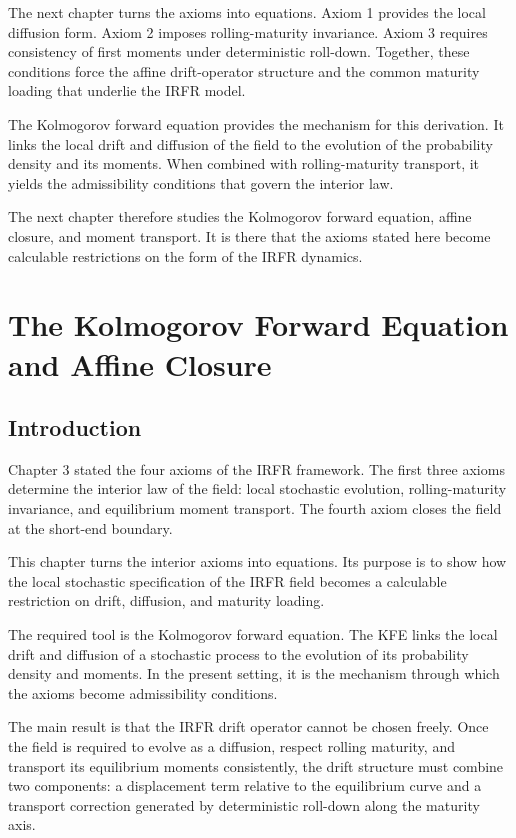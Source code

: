 \documentclass[11pt,oneside]{book}
\begin{document}
The next chapter turns the axioms into equations. Axiom 1 provides the
local diffusion form. Axiom 2 imposes rolling-maturity invariance. Axiom
3 requires consistency of first moments under deterministic roll-down.
Together, these conditions force the affine drift-operator structure and
the common maturity loading that underlie the IRFR model.

The Kolmogorov forward equation provides the mechanism for this
derivation. It links the local drift and diffusion of the field to the
evolution of the probability density and its moments. When combined with
rolling-maturity transport, it yields the admissibility conditions that
govern the interior law.

The next chapter therefore studies the Kolmogorov forward equation,
affine closure, and moment transport. It is there that the axioms stated
here become calculable restrictions on the form of the IRFR dynamics.

\chapter{The Kolmogorov Forward Equation and Affine Closure}\label{chapter-4}

\section{Introduction}\label{introduction-2}

Chapter 3 stated the four axioms of the IRFR framework. The first three
axioms determine the interior law of the field: local stochastic
evolution, rolling-maturity invariance, and equilibrium moment
transport. The fourth axiom closes the field at the short-end boundary.

This chapter turns the interior axioms into equations. Its purpose is to
show how the local stochastic specification of the IRFR field becomes a
calculable restriction on drift, diffusion, and maturity loading.

The required tool is the Kolmogorov forward equation. The KFE links the
local drift and diffusion of a stochastic process to the evolution of
its probability density and moments. In the present setting, it is the
mechanism through which the axioms become admissibility conditions.

The main result is that the IRFR drift operator cannot be chosen freely.
Once the field is required to evolve as a diffusion, respect rolling
maturity, and transport its equilibrium moments consistently, the drift
structure must combine two components: a displacement term relative to
the equilibrium curve and a transport correction generated by
deterministic roll-down along the maturity axis.
\end{document}
